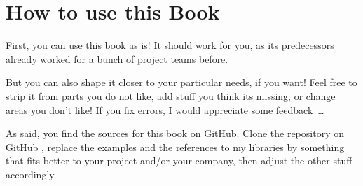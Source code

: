 \section{How to use this Book}\label{sec:HowToUseThisDocument}
First, you can use this book as is! It should work for you, as its predecessors already worked for a bunch of project teams before.

But you can also shape it closer to your particular needs, if you want! Feel free to strip it from parts you do not like, add stuff you think its missing, or change areas you don't like! If you fix errors, I would appreciate some feedback~…

As said, you find the sources for this book on GitHub. Clone the repository on GitHub \autocite{TQUADRAT_ORG_DOCUMENT_REPOSITORY}, replace the examples and the references to my libraries by something that fits better to your project and/or your company, then adjust the other stuff accordingly.

